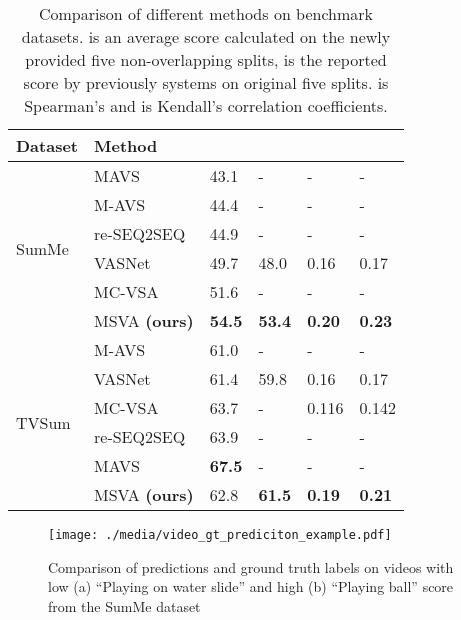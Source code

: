 \documentclass{article}
\begin{document}
\begin{table}[ht]
\caption{Comparison of different methods on benchmark datasets. is an average score calculated on the newly provided five non-overlapping splits,  is the reported score by previously systems on original five splits.  is Spearman’s and  is Kendall’s correlation coefficients.}
\centering
\begin{tabular}{|*{6}{l|}}
\hline

\textbf{Dataset} & Method &  &  &   &   \\ \hline

\multirow{6}{2.2em}{SumMe} & MAVS \cite{DBLP:conf/mm/FengLKZ18} & 43.1 & - & - & - \\ \cline{2-6}
 & M-AVS \cite{DBLP:journals/corr/abs-1708-09545} & 44.4 & - & - & - \\ \cline{2-6} 
&  re-SEQ2SEQ \cite{DBLP:conf/eccv/ZhangGS18} & 44.9 & - & - & -\\ \cline{2-6} 
&  VASNet \cite{DBLP:conf/accv/FajtlSAMR18} & 49.7 & 48.0 & 0.16 & 0.17
\\
\cline{2-6} &  MC-VSA \cite{DBLP:journals/corr/abs-2006-01410} & 51.6 & - & - & - \\
\cline{2-6} & MSVA \textbf{(ours)} & \textbf{54.5}  & \textbf{53.4} & \textbf{0.20} & \textbf{0.23} \\

 \hline \hline 

 \multirow{6}{2.2em}{TVSum} & M-AVS \cite{DBLP:journals/corr/abs-1708-09545} &61.0 & - & - & - \\  \cline{2-6}
 &  VASNet \cite{DBLP:conf/accv/FajtlSAMR18} &61.4 & 59.8  & 0.16 & 0.17 \\  \cline{2-6}
&  MC-VSA \cite{DBLP:journals/corr/abs-2006-01410} & 63.7 & - & 0.116 & 0.142 \\  \cline{2-6} 
 &  re-SEQ2SEQ \cite{DBLP:conf/eccv/ZhangGS18} &63.9 & - & - & - \\ \cline{2-6}
 & MAVS \cite{DBLP:conf/mm/FengLKZ18} & \textbf{67.5} & - & - & - \\  \cline{2-6}
 & MSVA \textbf{(ours)} &62.8 & \textbf{61.5} & \textbf{0.19} & \textbf{0.21} \\
\hline 
 
\end{tabular}

\label{tab:overallcompare}
\end{table}

\begin{figure*}[!ht]
\begin{center}
\texttt{[image: ./media/video\_gt\_prediciton\_example.pdf]}
\caption{Comparison of predictions and ground truth labels on videos with low (a) ``Playing on water slide'' and high (b) ``Playing ball'' score from the SumMe dataset}
\label{fig:example_good_bad}
\end{center}
\end{figure*}
\end{document}
